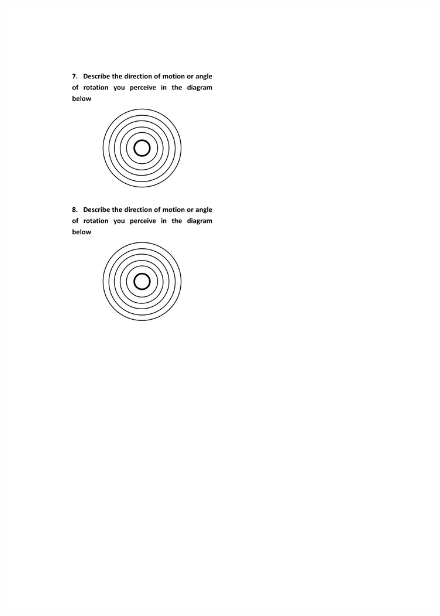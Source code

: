 \begin{figure}[h]
\centering
\includegraphics[width=1\textwidth,height=0.7\textheight]{A_thesis/appendix/Experiment1_questionnaire-2.png}
\end{figure}
\newpage

